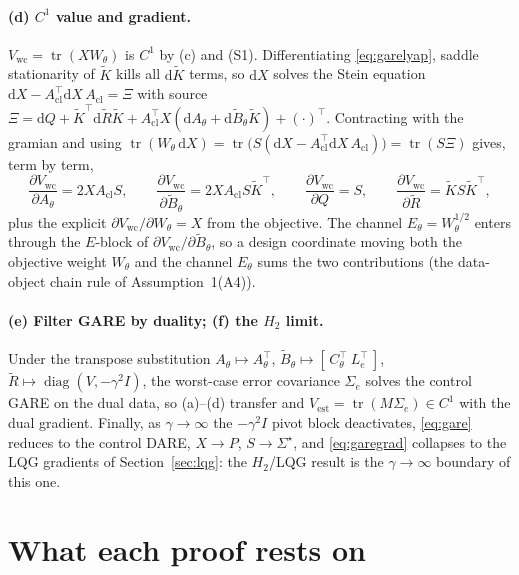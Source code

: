 \documentclass[11pt]{article}
\theoremstyle{definition}
\DeclareMathOperator{\tr}{tr}
\DeclareMathOperator{\diag}{diag}
\newcommand{\Acl}{A_{\mathrm{cl}}}
\newcommand{\Th}{\theta}
\newcommand{\half}{{1/2}}
\newcommand{\Vwc}{V_{\mathrm{wc}}}
\newcommand{\Vest}{V_{\mathrm{est}}}
\begin{document}
\paragraph{(d) $C^1$ value and gradient.}
$\Vwc=\tr(XW_\Th)$ is $C^1$ by (c) and (S1). Differentiating \eqref{eq:garelyap},
saddle stationarity of $\tilde K$ kills all $\mathrm d\tilde K$ terms, so
$\mathrm dX$ solves the Stein equation
$\mathrm dX-\Acl^\top\mathrm dX\,\Acl=\Xi$ with source
$\Xi=\mathrm dQ+\tilde K^\top\mathrm d\tilde R\tilde K
+\Acl^\top X(\mathrm dA_\Th+\mathrm d\tilde B_\Th\tilde K)+(\cdot)^\top$.
Contracting with the gramian and using
$\tr(W_\Th\,\mathrm dX)=\tr\!\big(S(\mathrm dX-\Acl^\top\mathrm dX\,\Acl)\big)
=\tr(S\Xi)$ gives, term by term,
\begin{equation}\label{eq:garegrad}
\frac{\partial\Vwc}{\partial A_\Th}=2X\Acl S,\qquad
\frac{\partial\Vwc}{\partial\tilde B_\Th}=2X\Acl S\tilde K^\top,\qquad
\frac{\partial\Vwc}{\partial Q}=S,\qquad
\frac{\partial\Vwc}{\partial\tilde R}=\tilde KS\tilde K^\top,
\end{equation}
plus the explicit $\partial\Vwc/\partial W_\Th=X$ from the objective. The channel
$E_\Th=W_\Th^{\half}$ enters through the $E$-block of $\partial\Vwc/\partial\tilde
B_\Th$, so a design coordinate moving both the objective weight $W_\Th$ and the
channel $E_\Th$ sums the two contributions (the data-object chain rule of
Assumption~1(A4)).

\paragraph{(e) Filter GARE by duality; (f) the $H_2$ limit.}
Under the transpose substitution $A_\Th\mapsto A_\Th^\top$,
$\tilde B_\Th\mapsto[\,C_\Th^\top\ L_e^\top\,]$,
$\tilde R\mapsto\diag(V,-\gamma^2I)$, the worst-case error covariance $\Sigma_e$
solves the control GARE on the dual data, so (a)--(d) transfer and
$\Vest=\tr(M\Sigma_e)\in C^1$ with the dual gradient. Finally, as
$\gamma\to\infty$ the $-\gamma^2I$ pivot block deactivates, \eqref{eq:gare} reduces
to the control DARE, $X\to P$, $S\to\Sigma^\star$, and \eqref{eq:garegrad}
collapses to the LQG gradients of Section~\ref{sec:lqg}: the $H_2$/LQG result is the
$\gamma\to\infty$ boundary of this one.

\section{What each proof rests on}\label{sec:summary}
\end{document}
